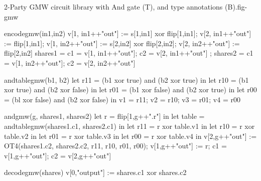 \begin{fpfig}[t]{2-Party GMW circuit library with And gate (T), and type annotations (B).}{fig-gmw}
{\footnotesize
  \begin{verbatimtab}
    encodegmw(in1,in2) {
      v[1, in1++"out"] := s[1,in1] xor flip[1,in1];
      v[2, in1++"out"] := flip[1,in1];
      v[1, in2++"out"] := s[2,in2] xor flip[2,in2];
      v[2, in2++"out"] := flip[2,in2]
      { shares1 = { c1 = v[1, in1++"out"]; c2 = v[2, in1++"out"] };
        shares2 = { c1 = v[1, in2++"out"]; c2 = v[2, in2++"out"]} } 
    }
    
    andtablegmw(b1, b2) {
      let r11 = (b1 xor true) and (b2 xor true) in
      let r10 = (b1 xor true) and (b2 xor false) in
      let r01 = (b1 xor false) and (b2 xor true) in
      let r00 = (bl xor false) and (b2 xor false) in
      { v1 = r11; v2 = r10; v3 = r01; v4 = r00 }
    }
    
    andgmw(g, shares1, shares2) {
      let r = flip[1,g++".r"] in
      let table = andtablegmw(shares1.c1, shares2.c1) in
      let r11 =  r xor table.v1 in
      let r10 =  r xor table.v2 in
      let r01 =  r xor table.v3 in
      let r00 =  r xor table.v4 in
        v[2,g++"out"] := OT4(shares1.c2, shares2.c2, r11, r10, r01, r00);
      v[1,g++"out"] := r;
      { c1 = v[1,g++"out"]; c2 = v[2,g++"out"]}
    }
    
    decodegmw(shares) { v[0,"output"] := shares.c1 xor shares.c2 }   \end{verbatimtab}
}
\end{fpfig}
